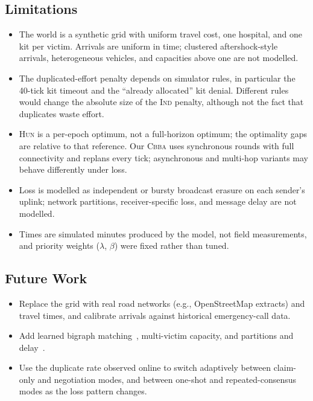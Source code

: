 \documentclass[conference]{IEEEtran}
\newcommand{\IND}{\textsc{Ind}}
\newcommand{\HUN}{\textsc{Hun}}
\newcommand{\CBBA}{\textsc{Cbba}}
\begin{document}
\subsection{Limitations}
\begin{itemize}
\item The world is a synthetic grid with uniform travel cost, one hospital, and one kit per victim. Arrivals are uniform in time; clustered aftershock-style arrivals, heterogeneous vehicles, and capacities above one are not modelled.
\item The duplicated-effort penalty depends on simulator rules, in particular the 40-tick kit timeout and the ``already allocated'' kit denial. Different rules would change the absolute size of the \IND{} penalty, although not the fact that duplicates waste effort.
\item \HUN{} is a per-epoch optimum, not a full-horizon optimum; the optimality gaps are relative to that reference. Our \CBBA{} uses synchronous rounds with full connectivity and replans every tick; asynchronous and multi-hop variants may behave differently under loss.
\item Loss is modelled as independent or bursty broadcast erasure on each sender's uplink; network partitions, receiver-specific loss, and message delay are not modelled.
\item Times are simulated minutes produced by the model, not field measurements, and priority weights ($\lambda$, $\beta$) were fixed rather than tuned.
\end{itemize}

\subsection{Future Work}
\begin{itemize}
\item Replace the grid with real road networks (e.g., OpenStreetMap extracts) and travel times, and calibrate arrivals against historical emergency-call data.
\item Add learned bigraph matching~\cite{ghassemi2022}, multi-victim capacity, and partitions and delay~\cite{gielis2022}.
\item Use the duplicate rate observed online to switch adaptively between claim-only and negotiation modes, and between one-shot and repeated-consensus modes as the loss pattern changes.
\end{itemize}

\end{document}
